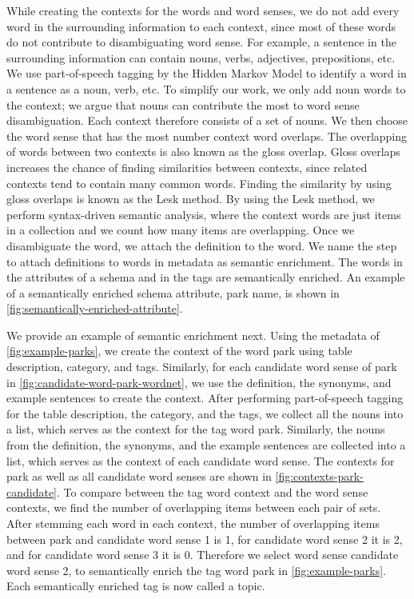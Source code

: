 While creating the contexts for the words and word senses, we do not add every word in the surrounding information to each context, since most of these words do not contribute to disambiguating word sense. For example, a sentence in the surrounding information can contain nouns, verbs, adjectives, prepositions, etc. We use part-of-speech tagging by the Hidden Markov Model to identify a word in a sentence as a noun, verb, etc. To simplify our work, we only add noun words to the context; we argue that nouns can contribute the most to word sense disambiguation. Each context therefore consists of a set of nouns. We then choose the word sense that has the most number context word overlaps.
The overlapping of words between two contexts is also known as the gloss overlap. Gloss overlaps increases the chance of finding similarities between contexts, since related contexts tend to contain many common words. Finding the similarity by using gloss overlaps is known as the Lesk method. By using the Lesk method, we perform syntax-driven semantic analysis, where the context words are just items in a collection and we count how many items are overlapping.
Once we disambiguate the word, we attach the definition to the word. We name the step to attach definitions to words in metadata as semantic enrichment. The words in the attributes of a schema and in the tags are semantically enriched. An example of a semantically enriched schema attribute, park name, is shown in \autoref{fig:semantically-enriched-attribute}.

We provide an example of semantic enrichment next. Using the metadata of \autoref{fig:example-parks}, we create the context of the word park using table description, category, and tags. Similarly, for each candidate word sense of park in \autoref{fig:candidate-word-park-wordnet}, we use the definition, the synonyms, and example sentences to create the context. After performing part-of-speech tagging for the table description, the category, and the tags, we collect all the nouns into a list, which serves as the context for the tag word park. Similarly, the nouns from the definition, the synonyms, and the example sentences are collected into a list, which serves as the context of each candidate word sense. The contexts for park as well as all candidate word senses are shown in \autoref{fig:contexts-park-candidate}.
To compare between the tag word context and the word sense contexts, we find the number of overlapping items between each pair of sets. After stemming each word in each context, the number of overlapping items between park and candidate word sense 1 is 1, for candidate word sense 2 it is 2, and for candidate word sense 3 it is 0. Therefore we select word sense candidate word sense 2, to semantically enrich the tag word park in \autoref{fig:example-parks}. Each semantically enriched tag is now called a topic.

